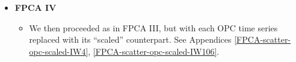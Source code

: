 \begin{itemize}
\item
	\textbf{FPCA IV}
	\begin{itemize}
	\item
		We then proceeded as in FPCA III, but with each OPC time series replaced
		with its ``scaled'' counterpart.
		See Appendices \ref{FPCA-scatter-opc-scaled-IW4}, \ref{FPCA-scatter-opc-scaled-IW106}.
	\end{itemize}
\end{itemize}


\renewcommand{\theenumi}{\roman{enumi}}
\renewcommand{\labelenumi}{\textnormal{(\theenumi)}$\;\;$}

